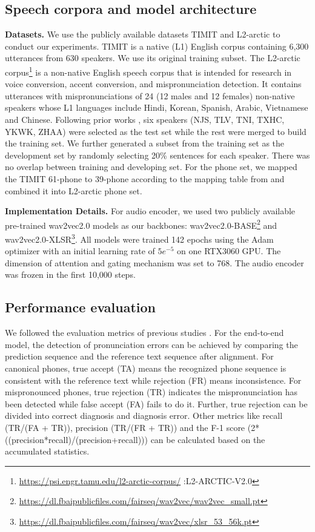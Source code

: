 \documentclass[a4paper]{article}
\begin{document}
\subsection{Speech corpora and model architecture}
\noindent \textbf{Datasets.} We use the publicly available datasets TIMIT \cite{garofolo1993darpa} and L2-arctic \cite{zhao2018l2} to conduct our experiments. TIMIT is a native (L1) English corpus containing 6,300 utterances from 630 speakers. We use its original training subset. The L2-arctic corpus\footnote{\url{https://psi.engr.tamu.edu/l2-arctic-corpus/} :L2-ARCTIC-V2.0} is a non-native English speech corpus that is intended for research in voice conversion, accent conversion, and mispronunciation detection. It contains utterances with mispronunciations of 24 (12 males and 12 females) non-native speakers whose L1 languages include Hindi, Korean, Spanish, Arabic, Vietnamese and Chinese. Following prior works \cite{feng2020sed,fu2021full,peng21e_interspeech}, six speakers (NJS, TLV, TNI, TXHC, YKWK, ZHAA) were selected as the test set while the rest were merged to build the training set. We further generated a subset from the training set as the development set by randomly selecting 20\% sentences for each speaker. There was no overlap between training and developing set. For the phone set, we mapped the TIMIT 61-phone to 39-phone according to the mapping table from \cite{lee1989speaker} and combined it into L2-arctic phone set. 

\noindent \textbf{Implementation Details.} For audio encoder, we used two publicly available pre-trained wav2vec2.0 models as our backbones: wav2vec2.0-BASE\footnote{\url{https://dl.fbaipublicfiles.com/fairseq/wav2vec/wav2vec_small.pt}} and wav2vec2.0-XLSR\footnote{\url{https://dl.fbaipublicfiles.com/fairseq/wav2vec/xlsr_53_56k.pt}}. 
All models were trained 142 epochs using the Adam optimizer with an initial learning rate of $5e^{-5}$ on one RTX3060 GPU. The dimension of attention and gating mechanism was set to 768. The audio encoder was frozen in the first 10,000 steps.

\subsection{Performance evaluation}
We followed the evaluation metrics of previous studies \cite{li2016mispronunciation}. For the end-to-end model, the detection of pronunciation errors can be achieved by comparing the prediction sequence and the reference text sequence after alignment. For canonical phones, true accept (TA) means the recognized phone sequence is consistent with the reference text while rejection (FR) means inconsistence. For mispronounced phones, true rejection (TR) indicates the mispronunciation has been detected while false accept (FA) fails to do it. Further, true rejection can be divided into correct diagnosis and diagnosis error. Other metrics like recall (TR/(FA + TR)), precision (TR/(FR + TR)) and the F-1 score (2*((precision*recall)/(precision+recall))) can be calculated based on the accumulated statistics.
\end{document}
